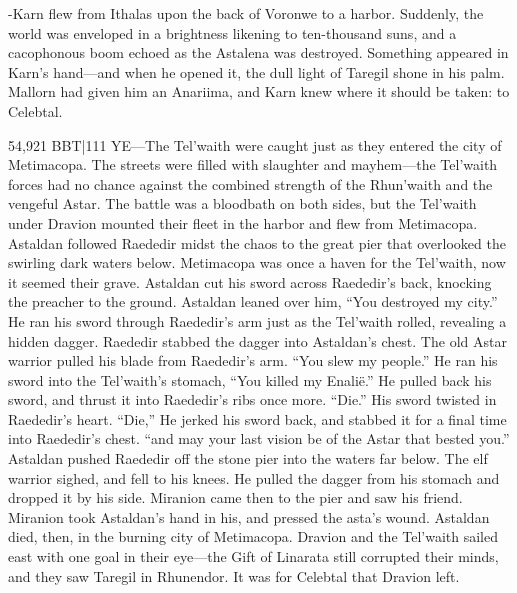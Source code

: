\documentclass[smalldemyvopaper,11pt,twoside,onecolumn,openright,extrafontsizes]{memoir}
\newlength\drop
\begin{document}
{{-Karn flew from Ithalas upon the back of Voronwe to a harbor. Suddenly, the world was enveloped in a brightness likening to ten-thousand suns, and a cacophonous boom echoed as the Astalena was destroyed. Something appeared in Karn’s hand—and when he opened it, the dull light of Taregil shone in his palm. Mallorn had given him an Anariima, and Karn knew where it should be taken: to Celebtal. 

54,921 BBT|111 YE—The Tel’waith were caught just as they entered the city of Metimacopa. The streets were filled with slaughter and mayhem—the Tel’waith forces had no chance against the combined strength of the Rhun’waith and the vengeful Astar. The battle was a bloodbath on both sides, but the Tel’waith under Dravion mounted their fleet in the harbor and flew from Metimacopa. Astaldan followed Raededir midst the chaos to the great pier that overlooked the swirling dark waters below. Metimacopa was once a haven for the Tel’waith, now it seemed their grave. Astaldan cut his sword across Raededir’s back, knocking the preacher to the ground. Astaldan leaned over him,
“You destroyed my city.”
He ran his sword through Raededir’s arm just as the Tel’waith rolled, revealing a hidden dagger. Raededir stabbed the dagger into Astaldan’s chest. The old Astar warrior pulled his blade from Raededir’s arm.
“You slew my people.”
He ran his sword into the Tel’waith’s stomach,
“You killed my Enalië.”
He pulled back his sword, and thrust it into Raededir’s ribs once more.
“Die.”
His sword twisted in Raededir’s heart.
“Die,”
He jerked his sword back, and stabbed it for a final time into Raededir’s chest.
“and may your last vision be of the Astar that bested you.”
Astaldan pushed Raededir off the stone pier into the waters far below. The elf warrior sighed, and fell to his knees. He pulled the dagger from his stomach and dropped it by his side. Miranion came then to the pier and saw his friend. Miranion took Astaldan’s hand in his, and pressed the asta’s wound. Astaldan died, then, in the burning city of Metimacopa. Dravion and the Tel’waith sailed east with one goal in their eye—the Gift of Linarata still corrupted their minds, and they saw Taregil in Rhunendor. It was for Celebtal that Dravion left.
}}
\end{document}
